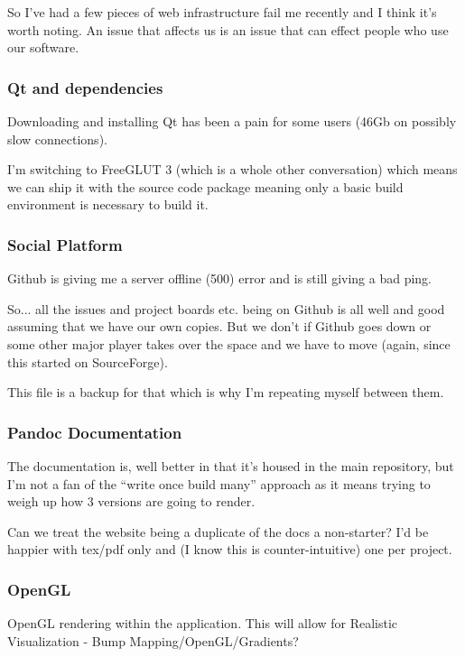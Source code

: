 \documentclass[a4paper, 11pt]{report}
\begin{document}
So I've had a few pieces of web infrastructure fail me recently and
I think it's worth noting. An issue that affects us is an issue that
can effect people who use our software.

\subsubsection{Qt and dependencies}

Downloading and installing Qt has been a pain for some users
(46Gb on possibly slow connections).

I'm switching to FreeGLUT 3 (which is a whole other conversation) which means we
can ship it with the source code package meaning only a basic build
environment is necessary to build it.

\subsubsection{Social Platform}

Github is giving me a server offline (500) error and is still giving a bad ping.

So... all the issues and project boards etc. being on Github is all well and good assuming that we have our own copies. But we don't if Github goes down or some other major player takes over the space and we have to move (again, since this started on SourceForge).

This file is a backup for that which is why I'm repeating myself between them.

\subsubsection{Pandoc Documentation}

The documentation is, well better in that it's housed in the main repository,
but I'm not a fan of the ``write once build many'' approach as it means
trying to weigh up how 3 versions are going to render.

Can we treat the website being a duplicate of the docs a non-starter?
I'd be happier with tex/pdf only and (I know this is counter-intuitive) one
per project.

\subsubsection{OpenGL}

OpenGL rendering within the application. This will allow for
Realistic Visualization - Bump Mapping/OpenGL/Gradients?
\end{document}

